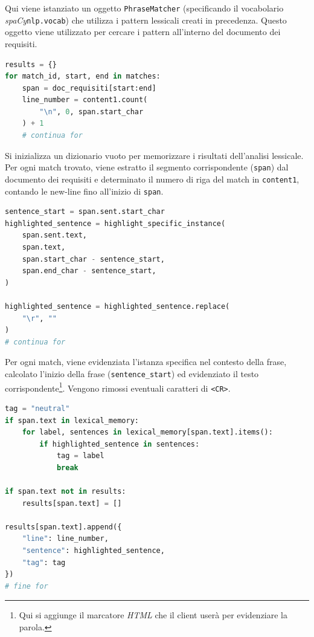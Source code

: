 \documentclass[12pt]{report}
\newcommand{\spacy}{\textsl{spaCy}\xspace}
\newcommand{\html}{\textsl{HTML}\xspace}
\begin{document}
\noindent Qui viene istanziato un oggetto \texttt{PhraseMatcher} (specificando il vocabolario \spacy \texttt{nlp.vocab}) che utilizza i pattern lessicali creati in precedenza. Questo oggetto viene utilizzato per cercare i pattern all'interno del documento dei requisiti.


\begin{mdframed}
\small
\begin{lstlisting}[language=Python]
results = {}
for match_id, start, end in matches:
    span = doc_requisiti[start:end]
    line_number = content1.count(
        "\n", 0, span.start_char
    ) + 1
    # continua for
\end{lstlisting}
\end{mdframed}

\noindent Si inizializza un dizionario vuoto per memorizzare i risultati dell'analisi lessicale. Per ogni match trovato, viene estratto il segmento corrispondente (\texttt{span}) dal documento dei requisiti e determinato il numero di riga del match in \texttt{content1}, contando le new-line fino all'inizio di \texttt{span}.


\begin{mdframed}
\small
\begin{lstlisting}[language=Python]
sentence_start = span.sent.start_char
highlighted_sentence = highlight_specific_instance(
    span.sent.text,
    span.text,
    span.start_char - sentence_start,
    span.end_char - sentence_start,
)

highlighted_sentence = highlighted_sentence.replace(
    "\r", ""
)
# continua for
\end{lstlisting}
\end{mdframed}

\noindent Per ogni match, viene evidenziata l'istanza specifica nel contesto della frase, calcolato l'inizio della frase (\texttt{sentence\_start}) ed evidenziato il testo corrispondente\footnote{Qui si aggiunge il marcatore \html che il client userà per evidenziare la parola.}. Vengono rimossi eventuali caratteri di \texttt{<CR>}.


\begin{mdframed}
\small
\begin{lstlisting}[language=Python]
tag = "neutral"
if span.text in lexical_memory:
    for label, sentences in lexical_memory[span.text].items():
        if highlighted_sentence in sentences:
            tag = label
            break

if span.text not in results:
    results[span.text] = []

results[span.text].append({
    "line": line_number,
    "sentence": highlighted_sentence,
    "tag": tag
})
# fine for
\end{lstlisting}
\end{mdframed}
\end{document}
